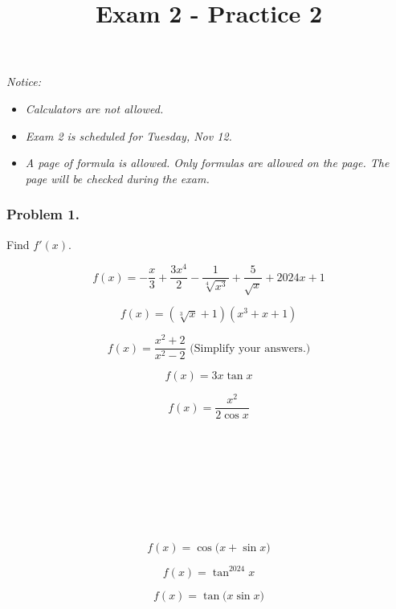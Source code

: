 \documentclass[
  letterpaper,
  DIV=11,
  numbers=noendperiod]{scrartcl}
\title{Exam 2 - Practice 2}
\author{}
\date{}
\providecommand{\tightlist}{%
  \setlength{\itemsep}{0pt}\setlength{\parskip}{0pt}}\usepackage{longtable,booktabs,array}
\begin{document}
\maketitle

\emph{Notice:}

\begin{itemize}
\tightlist
\item
  \emph{Calculators are not allowed.}
\item
  \emph{Exam 2 is scheduled for Tuesday, Nov 12.}
\item
  \emph{A page of formula is allowed. Only formulas are allowed on the
  page. The page will be checked during the exam.}
\end{itemize}

\subsubsection{Problem 1.}\label{problem-1.}

Find \(f'(x)\).

\[f(x) =  -\frac{x}{3} + \frac{3x^4}{2} - \frac{1}{\sqrt[4]{x^3}} + \frac{5}{\sqrt{x}} + 2024x + 1\]

\hfill\break
\hfill\break
\hfill\break
\hfill\break

\[f(x) = (\sqrt[3]{x}+1)(x^3+x+1)\]

\hfill\break
\hfill\break
\hfill\break
\hfill\break
\hfill\break

\[f(x) = \frac{x^2+2}{x^2-2} \text{   (Simplify your answers.)}\]

\hfill\break
\hfill\break
\hfill\break
\hfill\break
\hfill\break

\[f(x) = 3x\tan x\]

\hfill\break
\hfill\break
\hfill\break
\hfill\break
\hfill\break

\[f(x) = \frac{x^2}{2\cos x}\]\\
\strut \\
\strut \\
\strut \\
\strut \\

\[f(x) = \cos \bigg(x + \sin x \bigg)\]

\hfill\break
\hfill\break
\hfill\break
\hfill\break
\hfill\break

\[f(x) = \tan^{2024}x\]

\hfill\break
\hfill\break
\hfill\break
\hfill\break
\hfill\break

\[f(x) = \tan\bigg(x \sin x\bigg)\]
\end{document}
